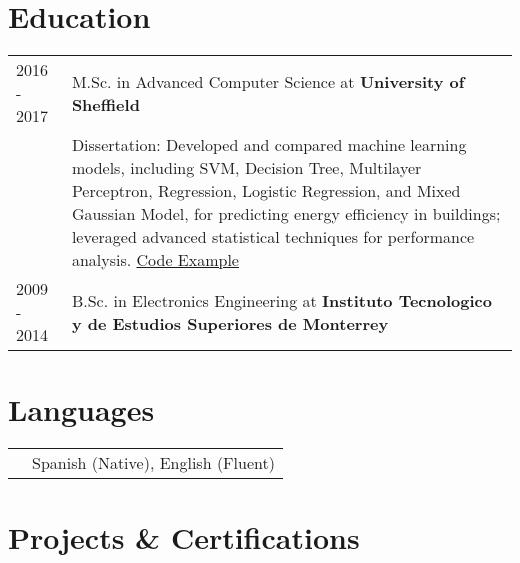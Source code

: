 \documentclass[a4paper,12pt]{article}
\begin{document}
\section{Education}
\begin{tabularx}{\linewidth}{@{}l X@{}}	
    2016 - 2017 & M.Sc. in Advanced Computer Science at \textbf{University of Sheffield} \\
    & Dissertation: Developed and compared machine learning models, including SVM, Decision Tree, Multilayer Perceptron, Regression, Logistic Regression, and Mixed Gaussian Model, for predicting energy efficiency in buildings; leveraged advanced statistical techniques for performance analysis. \href{https://github.com/dcerdac/DissertationCode}{Code Example} \\
    2009 - 2014 & B.Sc. in Electronics Engineering at \textbf{Instituto Tecnologico y de Estudios Superiores de Monterrey} \\
\end{tabularx}

\section{Languages}
\begin{tabularx}{\linewidth}{@{}l X@{}}
& \normalsize{Spanish (Native), English (Fluent)}\\
\end{tabularx}

\section{Projects \& Certifications}
\end{document}
